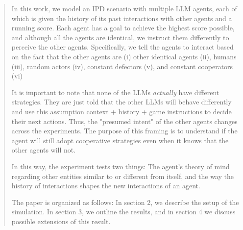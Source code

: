 \documentclass[%
 reprint,
 amsmath,amssymb,
 aps,
]{revtex4-2}
\begin{document}
\begin{abstract}
In this work, we model an IPD scenario with multiple LLM agents, each of which is given the history of its past interactions with other agents and a running score. Each agent has a goal to achieve the highest score possible, and although all the agents are identical, we instruct them differently to perceive the other agents. Specifically, we tell the agents to interact based on the fact that the other agents are (i) other identical agents (ii), humans (iii), random actors (iv), constant defectors (v), and constant cooperators (vi)

It is important to note that none of the LLMs \textit{actually} have different strategies. They are just told that the other LLMs will behave differently and use this assumption context + history + game instructions to decide their next actions. Thus, the "presumed intent" of the other agents changes across the experiments. The purpose of this framing is to understand if the agent will still adopt cooperative strategies even when it knows that the other agents will not. 

In this way, the experiment tests two things: The agent's theory of mind regarding other entities similar to or different from itself,  and the way the history of interactions shapes the new interactions of an agent.

The paper is organized as follows: In section 2, we describe the setup of the simulation. In section 3, we outline the results, and in section 4 we discuss possible extensions of this result. 






\end{abstract}
\end{document}
